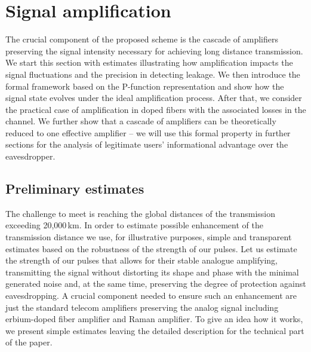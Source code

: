 \documentclass[a4paper]{article}
\begin{document}
\section{Signal amplification}
The crucial component of the proposed scheme is the cascade of amplifiers preserving the signal intensity necessary for achieving long distance transmission. 
We start this section with estimates illustrating how amplification impacts the signal fluctuations and the precision in detecting leakage.
We then introduce the formal framework based on the P-function representation and show how the signal state evolves under the ideal amplification process.
After that, we consider the practical case of amplification in doped fibers with the associated losses in the channel.
We further show that a cascade of amplifiers can be theoretically reduced to one effective amplifier -- we will use this formal property in further sections for the analysis of legitimate users' informational advantage over the eavesdropper.

\subsection{Preliminary estimates}

The challenge to meet is reaching the global distances of the transmission exceeding 20,000\,km. %
In order to estimate possible enhancement of the transmission distance we use, for illustrative purposes, simple and transparent estimates based on the robustness of the strength of our pulses.
Let us estimate the strength of our pulses that allows for their stable analogue amplifying, transmitting the signal without distorting its shape and phase with the minimal generated noise and, at the same time, preserving the degree of protection against eavesdropping.
A crucial component needed to ensure such an enhancement are just the standard telecom amplifiers preserving the analog signal including erbium-doped fiber amplifier and Raman amplifier. 
To give an idea how it works, we present simple estimates leaving the detailed description for the technical part of the paper.
\end{document}
